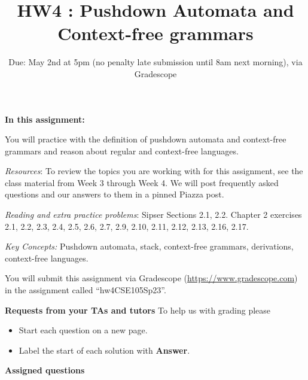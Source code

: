 \newpage

\title{HW4 : Pushdown Automata and Context-free grammars}
\date{Due: May 2nd at 5pm (no penalty late submission until 8am next morning), via Gradescope}


\maketitle
\thispagestyle{fancy}

\textbf{In this assignment:}

You will  practice with the definition of pushdown automata and context-free grammars and reason
about regular and context-free languages.

\textit{Resources}: To review the topics you are working with for this assignment, 
see the class material from Week 3 through Week 4. We will post frequently asked questions and 
our answers to them in a pinned Piazza post.

\textit{Reading and extra practice problems}: Sipser Sections 2.1, 2.2. 
Chapter 2 exercises 2.1, 2.2, 2.3, 2.4, 2.5, 2.6, 2.7, 2.9, 2.10, 2.11, 2.12, 2.13, 2.16, 2.17.

\textit{Key Concepts:} Pushdown automata, stack, context-free grammars, derivations, 
context-free languages.

\instructions

You will submit this assignment via Gradescope
(\href{https://www.gradescope.com}{https://www.gradescope.com}) 
in the assignment called ``hw4CSE105Sp23''.

\textbf{Requests from your TAs and tutors}
To help us with grading please 
\begin{itemize}
    \item Start each question on a new page.
    \item Label the start of each solution with {\bf Answer}.
\end{itemize}

\textbf{Assigned questions}


